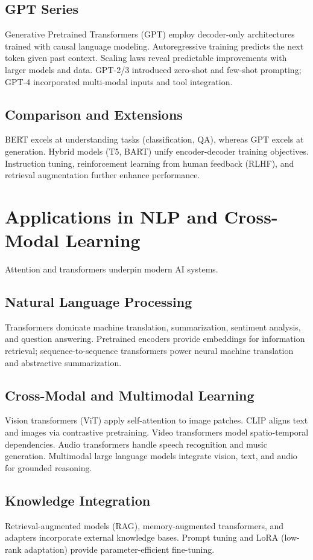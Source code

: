 ﻿\documentclass[12pt]{article}
\begin{document}
\subsection{GPT Series}
Generative Pretrained Transformers (GPT) employ decoder-only architectures trained with causal language modeling. Autoregressive training predicts the next token given past context. Scaling laws reveal predictable improvements with larger models and data. GPT-2/3 introduced zero-shot and few-shot prompting; GPT-4 incorporated multi-modal inputs and tool integration.

\subsection{Comparison and Extensions}
BERT excels at understanding tasks (classification, QA), whereas GPT excels at generation. Hybrid models (T5, BART) unify encoder-decoder training objectives. Instruction tuning, reinforcement learning from human feedback (RLHF), and retrieval augmentation further enhance performance.

\section{Applications in NLP and Cross-Modal Learning}
Attention and transformers underpin modern AI systems.

\subsection{Natural Language Processing}
Transformers dominate machine translation, summarization, sentiment analysis, and question answering. Pretrained encoders provide embeddings for information retrieval; sequence-to-sequence transformers power neural machine translation and abstractive summarization.

\subsection{Cross-Modal and Multimodal Learning}
Vision transformers (ViT) apply self-attention to image patches. CLIP aligns text and images via contrastive pretraining. Video transformers model spatio-temporal dependencies. Audio transformers handle speech recognition and music generation. Multimodal large language models integrate vision, text, and audio for grounded reasoning.

\subsection{Knowledge Integration}
Retrieval-augmented models (RAG), memory-augmented transformers, and adapters incorporate external knowledge bases. Prompt tuning and LoRA (low-rank adaptation) provide parameter-efficient fine-tuning.
\end{document}
